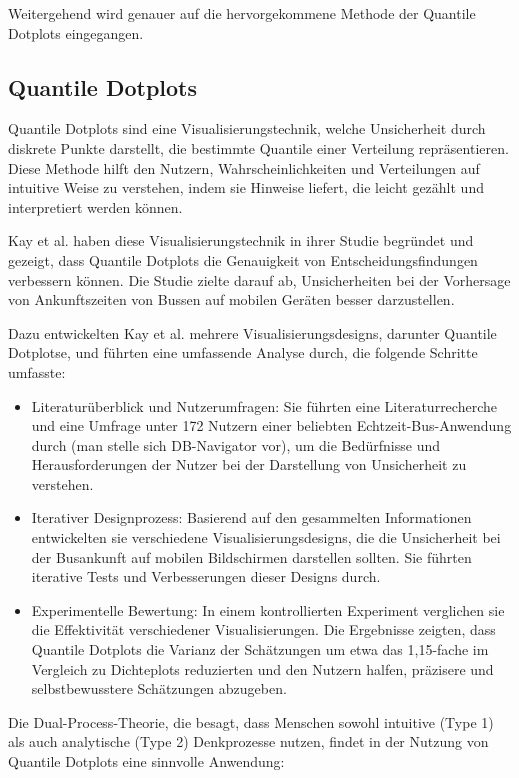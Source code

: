 Weitergehend wird genauer auf die hervorgekommene Methode der Quantile Dotplots eingegangen.

\subsection{Quantile Dotplots}

Quantile Dotplots sind eine Visualisierungstechnik, welche Unsicherheit durch diskrete Punkte darstellt, die bestimmte Quantile einer Verteilung repräsentieren. Diese Methode hilft den Nutzern, Wahrscheinlichkeiten und Verteilungen auf intuitive Weise zu verstehen, indem sie Hinweise liefert, die leicht gezählt und interpretiert werden können.

Kay et al. \cite{Kay2016} haben diese Visualisierungstechnik in ihrer Studie begründet und gezeigt, dass Quantile Dotplots die Genauigkeit von Entscheidungsfindungen verbessern können. Die Studie zielte darauf ab, Unsicherheiten bei der Vorhersage von Ankunftszeiten von Bussen auf mobilen Geräten besser darzustellen.

Dazu entwickelten Kay et al. mehrere Visualisierungsdesigns, darunter Quantile Dotplotse, und führten eine umfassende Analyse durch, die folgende Schritte umfasste:

\begin{itemize}
    \item Literaturüberblick und Nutzerumfragen: Sie führten eine Literaturrecherche und eine Umfrage unter 172 Nutzern einer beliebten Echtzeit-Bus-Anwendung durch (man stelle sich DB-Navigator vor), um die Bedürfnisse und Herausforderungen der Nutzer bei der Darstellung von Unsicherheit zu verstehen.
    \item Iterativer Designprozess: Basierend auf den gesammelten Informationen entwickelten sie verschiedene Visualisierungsdesigns, die die Unsicherheit bei der Busankunft auf mobilen Bildschirmen darstellen sollten. Sie führten iterative Tests und Verbesserungen dieser Designs durch.
    \item Experimentelle Bewertung: In einem kontrollierten Experiment verglichen sie die Effektivität verschiedener Visualisierungen. Die Ergebnisse zeigten, dass Quantile Dotplots die Varianz der Schätzungen um etwa das 1,15-fache im Vergleich zu Dichteplots reduzierten und den Nutzern halfen, präzisere und selbstbewusstere Schätzungen abzugeben.
\end{itemize}

Die Dual-Process-Theorie, die besagt, dass Menschen sowohl intuitive (Type 1) als auch analytische (Type 2) Denkprozesse nutzen, findet in der Nutzung von Quantile Dotplots eine sinnvolle Anwendung:

